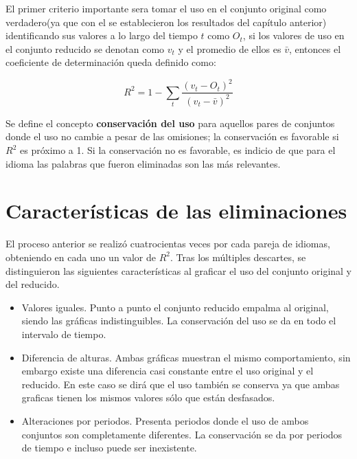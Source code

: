 El primer criterio importante sera tomar el uso en el conjunto original como verdadero(ya que con el se establecieron los resultados del capítulo anterior) identificando sus valores a lo largo del tiempo $t$ como $O_{t}$, si los valores de uso en el conjunto reducido se denotan como  $v_{t}$ y el promedio de ellos es $\bar{v}$, entonces   el coeficiente de determinación queda definido como:
 
\begin{equation}
 \label{ec.dif_uso}
 R^{2} = 1 - \sum_{t} \frac{ \left( v_{t}- O_{t} \right)^{2}  }{ \left( v_{t} - \bar{v} \right)^{2} }
\end{equation}

Se define el concepto \textbf{conservación del uso} para aquellos pares de conjuntos donde el uso no cambie a pesar de las omisiones; la conservación es favorable si $R^{2}$ es próximo a 1.  Si la conservación no es favorable, es indicio de que para el idioma las palabras que fueron eliminadas son las más relevantes. 

\section{Características de las eliminaciones}

El proceso anterior se realizó cuatrocientas veces por cada pareja de idiomas, obteniendo en cada uno un valor de $R^{2}$. Tras los múltiples descartes, se distinguieron las siguientes características al graficar el uso del conjunto original y del reducido. 


\begin{itemize}
	
	\item Valores iguales. Punto a punto el conjunto reducido empalma al original, siendo las gráficas indistinguibles. La conservación del uso se da en todo el intervalo de tiempo. 
	
	\item Diferencia de alturas. Ambas gráficas muestran el mismo comportamiento, sin embargo existe una diferencia casi constante entre el uso original y el reducido. En este caso se dirá que el uso también se conserva ya que ambas graficas tienen los mismos valores sólo que están desfasados. 
	
	\item Alteraciones por periodos.  Presenta periodos donde el uso de ambos conjuntos son completamente diferentes. La conservación se da por periodos de tiempo e incluso puede ser inexistente.

	
\end{itemize}

